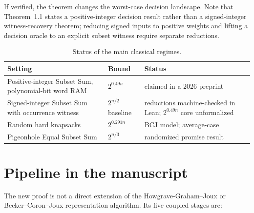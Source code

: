 \documentclass[11pt]{article}
\begin{document}
If verified, the theorem changes the worst-case decision landscape. Note that
Theorem~1.1 states a positive-integer decision result rather than a
signed-integer witness-recovery theorem; reducing signed inputs to positive
weights and lifting a decision oracle to an explicit subset witness require
separate reductions.

\begin{table}[t]
\centering
\caption{Status of the main classical regimes.}
\begin{tabular}{p{4.7cm}p{3.2cm}p{4.2cm}}
\toprule
Setting & Bound & Status \\
\midrule
Positive-integer Subset Sum, polynomial-bit word RAM & $2^{0.49n}$ & claimed in a 2026 preprint \\
Signed-integer Subset Sum with occurrence witness & $2^{n/2}$ baseline & reductions machine-checked in Lean; $2^{0.49n}$ core unformalized \\
Random hard knapsacks & $2^{0.291n}$ & BCJ model; average-case \\
Pigeonhole Equal Subset Sum & $2^{n/3}$ & randomized promise result \\
\bottomrule
\end{tabular}
\end{table}

\section{Pipeline in the manuscript}

The new proof is not a direct extension of the Howgrave-Graham--Joux or
Becker--Coron--Joux representation algorithm. Its five coupled stages are:
\end{document}
